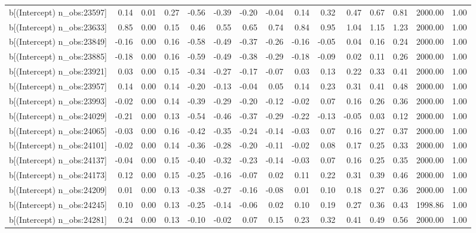 \begin{table}[ht]
\begin{tabular}{rrrrrrrrrrrrrrr}
  b[(Intercept) n\_obs:23597] & 0.14 & 0.01 & 0.27 & -0.56 & -0.39 & -0.20 & -0.04 & 0.14 & 0.32 & 0.47 & 0.67 & 0.81 & 2000.00 & 1.00 \\ 
  b[(Intercept) n\_obs:23633] & 0.85 & 0.00 & 0.15 & 0.46 & 0.55 & 0.65 & 0.74 & 0.84 & 0.95 & 1.04 & 1.15 & 1.23 & 2000.00 & 1.00 \\ 
  b[(Intercept) n\_obs:23849] & -0.16 & 0.00 & 0.16 & -0.58 & -0.49 & -0.37 & -0.26 & -0.16 & -0.05 & 0.04 & 0.16 & 0.24 & 2000.00 & 1.00 \\ 
  b[(Intercept) n\_obs:23885] & -0.18 & 0.00 & 0.16 & -0.59 & -0.49 & -0.38 & -0.29 & -0.18 & -0.09 & 0.02 & 0.11 & 0.26 & 2000.00 & 1.00 \\ 
  b[(Intercept) n\_obs:23921] & 0.03 & 0.00 & 0.15 & -0.34 & -0.27 & -0.17 & -0.07 & 0.03 & 0.13 & 0.22 & 0.33 & 0.41 & 2000.00 & 1.00 \\ 
  b[(Intercept) n\_obs:23957] & 0.14 & 0.00 & 0.14 & -0.20 & -0.13 & -0.04 & 0.05 & 0.14 & 0.23 & 0.31 & 0.41 & 0.48 & 2000.00 & 1.00 \\ 
  b[(Intercept) n\_obs:23993] & -0.02 & 0.00 & 0.14 & -0.39 & -0.29 & -0.20 & -0.12 & -0.02 & 0.07 & 0.16 & 0.26 & 0.36 & 2000.00 & 1.00 \\ 
  b[(Intercept) n\_obs:24029] & -0.21 & 0.00 & 0.13 & -0.54 & -0.46 & -0.37 & -0.29 & -0.22 & -0.13 & -0.05 & 0.03 & 0.12 & 2000.00 & 1.00 \\ 
  b[(Intercept) n\_obs:24065] & -0.03 & 0.00 & 0.16 & -0.42 & -0.35 & -0.24 & -0.14 & -0.03 & 0.07 & 0.16 & 0.27 & 0.37 & 2000.00 & 1.00 \\ 
  b[(Intercept) n\_obs:24101] & -0.02 & 0.00 & 0.14 & -0.36 & -0.28 & -0.20 & -0.11 & -0.02 & 0.08 & 0.17 & 0.25 & 0.33 & 2000.00 & 1.00 \\ 
  b[(Intercept) n\_obs:24137] & -0.04 & 0.00 & 0.15 & -0.40 & -0.32 & -0.23 & -0.14 & -0.03 & 0.07 & 0.16 & 0.25 & 0.35 & 2000.00 & 1.00 \\ 
  b[(Intercept) n\_obs:24173] & 0.12 & 0.00 & 0.15 & -0.25 & -0.16 & -0.07 & 0.02 & 0.11 & 0.22 & 0.31 & 0.39 & 0.46 & 2000.00 & 1.00 \\ 
  b[(Intercept) n\_obs:24209] & 0.01 & 0.00 & 0.13 & -0.38 & -0.27 & -0.16 & -0.08 & 0.01 & 0.10 & 0.18 & 0.27 & 0.36 & 2000.00 & 1.00 \\ 
  b[(Intercept) n\_obs:24245] & 0.10 & 0.00 & 0.13 & -0.25 & -0.14 & -0.06 & 0.02 & 0.10 & 0.19 & 0.27 & 0.36 & 0.43 & 1998.86 & 1.00 \\ 
  b[(Intercept) n\_obs:24281] & 0.24 & 0.00 & 0.13 & -0.10 & -0.02 & 0.07 & 0.15 & 0.23 & 0.32 & 0.41 & 0.49 & 0.56 & 2000.00 & 1.00 \\ 

\end{tabular}
\end{table}
